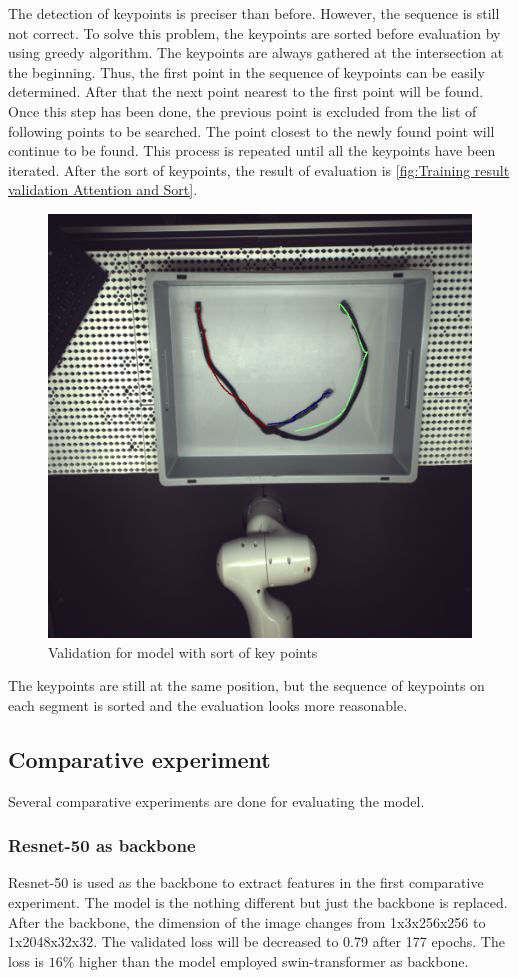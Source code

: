 	The detection of keypoints is preciser than before. However, the sequence is still not correct.
	To solve this problem, the keypoints are sorted before evaluation by using greedy algorithm. The keypoints are always gathered 
	at the intersection at the beginning. Thus, the first point in the sequence of keypoints can be easily determined. After that the 
	next point nearest to the first point will be found. Once this step has been done, the previous point is excluded from the list of 
	following points to be searched. The point closest to the newly found point will continue to be found. This process is repeated 
	until all the keypoints have been iterated. After the sort of keypoints, the result of evaluation is \autoref{fig:Training result validation Attention and Sort}.\\
	\begin{figure}
		\centering
		\includegraphics[width=0.6\linewidth]{example_images/withAttn_sort_keypoints_100_eval}
		\caption{Validation for model with sort of key points}
		\label{fig:Training result validation Attention and Sort}
	\end{figure}
	The keypoints are still at the same position, but the sequence of keypoints on each segment is sorted and the evaluation looks more reasonable. 
\subsection{Comparative experiment}
	Several comparative experiments are done for evaluating the model.\\ 
\subsubsection{Resnet-50 as backbone}
	Resnet-50 is used as the backbone to extract features in the first comparative experiment. The model is the nothing different but just the backbone is 
	replaced. After the backbone, the dimension of the image changes from 1x3x256x256 to 1x2048x32x32. The validated loss will be decreased to 0.79 after 
	177 epochs. The loss is $16\%$ higher than the model employed swin-transformer as backbone.  

